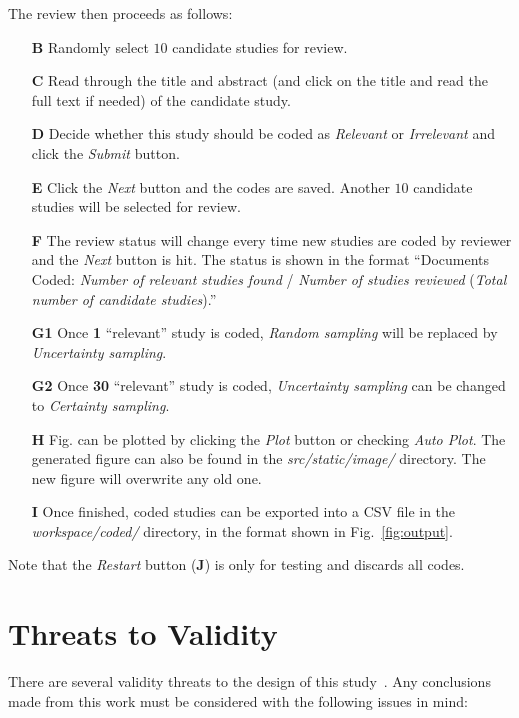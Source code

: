 \documentclass{svjour3}
\theoremstyle{break}
\begin{document}
The review then proceeds as follows:
\begin{enumerate}
\item[\textbf{B}] Randomly select $10$ candidate studies for review.
\item[\textbf{C}] Read through the title and abstract (and click on the title and read the full text if needed) of the candidate study.
\item[\textbf{D}] Decide whether this study should be coded as \textit{Relevant} or \textit{Irrelevant} and click the \textit{Submit} button.
\item[\textbf{E}] Click the \textit{Next} button and the codes are saved. Another $10$ candidate studies will be selected for review.
\item[\textbf{F}] The review status will change every time new studies are coded by reviewer and the \textit{Next} button is hit. The status is shown in the format ``Documents Coded: \textit{Number of relevant studies found} / \textit{Number of studies reviewed} (\textit{Total number of candidate studies}).''
\item[\textbf{G1}] Once \textbf{1} ``relevant'' study is coded, \textit{Random sampling} will be replaced by \textit{Uncertainty sampling}.
\item[\textbf{G2}] Once \textbf{30} ``relevant'' study is coded, \textit{Uncertainty sampling} can be changed to \textit{Certainty sampling}.
\item[\textbf{H}] Fig. can be plotted by clicking the \textit{Plot} button or checking \textit{Auto Plot}. The generated figure can also be found in the \textit{src/static/image/} directory. The new figure will overwrite any old one.
\item[\textbf{I}] Once finished, coded studies can be exported into a CSV file in the \textit{workspace/coded/} directory, in the format shown in Fig.~\ref{fig:output}.
\end{enumerate}

Note that the \textit{Restart} button (\textbf{J}) is only for testing and discards all codes.



\section{Threats to Validity}
\label{sect: Threats to Validity}

There are several validity threats to the design of this study~\cite{feldt2010validity}. Any conclusions made from this work must be considered with the following issues in mind:
\end{document}
